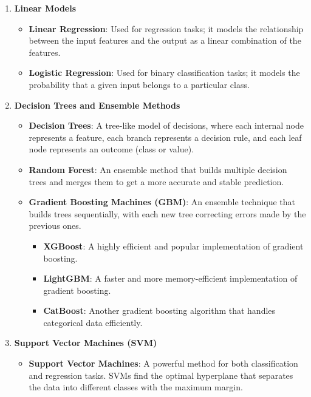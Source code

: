 \begin{enumerate}
    \item \textbf{Linear Models}
    \begin{itemize}
        \item \textbf{Linear Regression}: Used for regression tasks; it models the relationship between the input features and the output as a linear combination of the features.
        \item \textbf{Logistic Regression}: Used for binary classification tasks; it models the probability that a given input belongs to a particular class.
    \end{itemize}
    
    \item \textbf{Decision Trees and Ensemble Methods}
    \begin{itemize}
        \item \textbf{Decision Trees}: A tree-like model of decisions, where each internal node represents a feature, each branch represents a decision rule, and each leaf node represents an outcome (class or value).
        \item \textbf{Random Forest}: An ensemble method that builds multiple decision trees and merges them to get a more accurate and stable prediction.
        \item \textbf{Gradient Boosting Machines (GBM)}: An ensemble technique that builds trees sequentially, with each new tree correcting errors made by the previous ones.
        \begin{itemize}
            \item \textbf{XGBoost}: A highly efficient and popular implementation of gradient boosting.
            \item \textbf{LightGBM}: A faster and more memory-efficient implementation of gradient boosting.
            \item \textbf{CatBoost}: Another gradient boosting algorithm that handles categorical data efficiently.
        \end{itemize}
    \end{itemize}

    \item \textbf{Support Vector Machines (SVM)}
    \begin{itemize}
        \item \textbf{Support Vector Machines}: A powerful method for both classification and regression tasks. SVMs find the optimal hyperplane that separates the data into different classes with the maximum margin.
    \end{itemize}


\end{enumerate}

